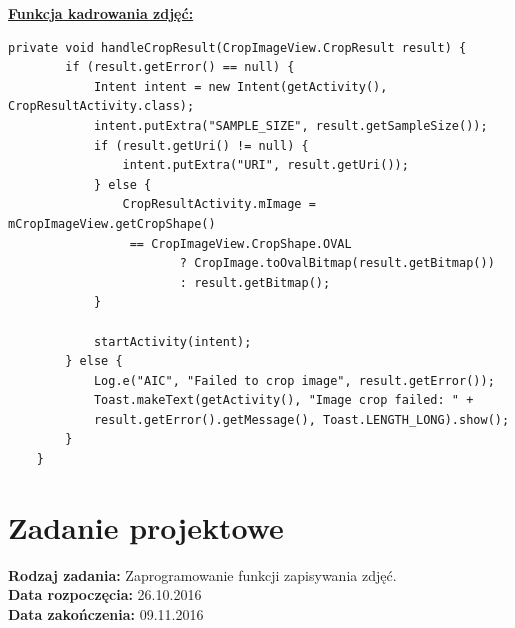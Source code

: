 \begin{center}
\underline{\textbf{Funkcja kadrowania zdjęć:}}
\end{center}
\begin{verbatim}
private void handleCropResult(CropImageView.CropResult result) {
        if (result.getError() == null) {
            Intent intent = new Intent(getActivity(), CropResultActivity.class);
            intent.putExtra("SAMPLE_SIZE", result.getSampleSize());
            if (result.getUri() != null) {
                intent.putExtra("URI", result.getUri());
            } else {
                CropResultActivity.mImage = mCropImageView.getCropShape()
                 == CropImageView.CropShape.OVAL
                        ? CropImage.toOvalBitmap(result.getBitmap())
                        : result.getBitmap();
            }

            startActivity(intent);
        } else {
            Log.e("AIC", "Failed to crop image", result.getError());
            Toast.makeText(getActivity(), "Image crop failed: " + 
            result.getError().getMessage(), Toast.LENGTH_LONG).show();
        }
    }
\end{verbatim}

\section{Zadanie projektowe}
\noindent\textbf{Rodzaj zadania:}  Zaprogramowanie funkcji zapisywania zdjęć.\\

\noindent\textbf{Data rozpoczęcia:} 26.10.2016\\

\noindent\textbf{Data zakończenia:} 09.11.2016\\

